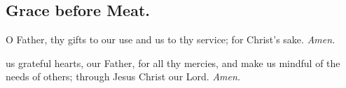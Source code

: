 \subsection{Grace before Meat.}
 O Father, thy gifts to our use and us to thy service; for Christ's sake. \textit{Amen.}


 us grateful hearts, our Father, for all thy mercies, and make us mindful of the needs of others; through Jesus Christ our Lord. \textit{Amen.}